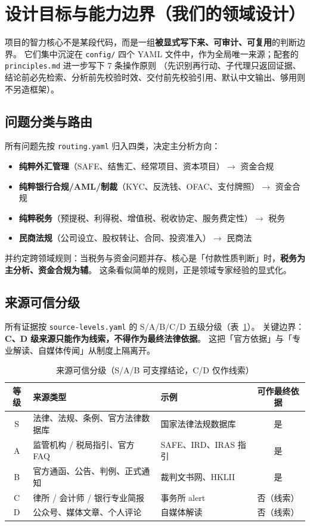 \documentclass[a4paper,11pt]{ctexart}
\newcommand{\id}[1]{\texttt{#1}}
\begin{document}
\section{设计目标与能力边界（我们的领域设计）}

项目的智力核心不是某段代码，而是一组\textbf{被显式写下来、可审计、可复用}的判断边界。
它们集中沉淀在 \id{config/} 四个 YAML 文件中，作为全局唯一来源；配套的 \id{principles.md} 进一步写下 7 条操作原则
（先识别再行动、子代理只返回证据、结论前必先检索、分析前先校验时效、交付前先校验引用、默认中文输出、够用则不另造框架）。

\subsection{问题分类与路由}
所有问题先按 \id{routing.yaml} 归入四类，决定主分析方向：
\begin{itemize}
\item \textbf{纯粹外汇管理}（SAFE、结售汇、经常项目、资本项目）$\rightarrow$ 资金合规
\item \textbf{纯粹银行合规/AML/制裁}（KYC、反洗钱、OFAC、支付牌照）$\rightarrow$ 资金合规
\item \textbf{纯粹税务}（预提税、利得税、增值税、税收协定、服务费定性）$\rightarrow$ 税务
\item \textbf{民商法规}（公司设立、股权转让、合同、投资准入）$\rightarrow$ 民商法
\end{itemize}
并约定跨领域规则：当税务与资金问题并存、核心是「付款性质判断」时，\textbf{税务为主分析、资金合规为辅}。
这条看似简单的规则，正是领域专家经验的显式化。

\subsection{来源可信分级}
所有证据按 \id{source-levels.yaml} 的 S/A/B/C/D 五级分级（表~\ref{tab:levels}）。
关键边界：\textbf{C、D 级来源只能作为线索，不得作为最终法律依据}。
这把「官方依据」与「专业解读、自媒体传闻」从制度上隔离开。

\begin{table}[h]\centering\small
\caption{来源可信分级（S/A/B 可支撑结论，C/D 仅作线索）}\label{tab:levels}
\begin{tabular}{cll c}
\toprule
\textbf{等级} & \textbf{来源类型} & \textbf{示例} & \textbf{可作最终依据} \\
\midrule
S & 法律、法规、条例、官方法律数据库 & 国家法律法规数据库 & 是 \\
A & 监管机构 / 税局指引、官方 FAQ & SAFE、IRD、IRAS 指引 & 是 \\
B & 官方通函、公告、判例、正式通知 & 裁判文书网、HKLII & 是 \\
C & 律所 / 会计师 / 银行专业简报 & 事务所 alert & 否（线索） \\
D & 公众号、媒体文章、个人评论 & 自媒体解读 & 否（线索） \\
\bottomrule
\end{tabular}
\end{table}
\end{document}
